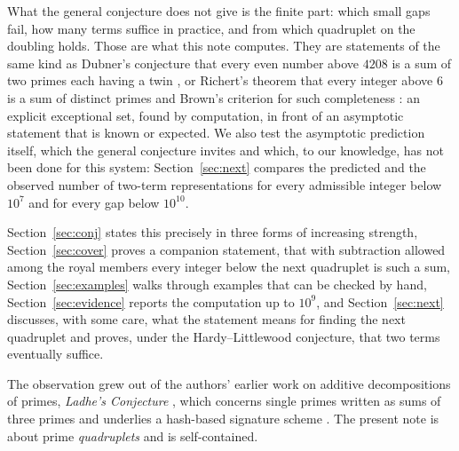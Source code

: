 \documentclass[11pt,a4paper]{article}
\begin{document}
What the general conjecture does not give is the finite part: which small
gaps fail, how many terms suffice in practice, and from which quadruplet on
the doubling holds. Those are what this note computes. They are statements
of the same kind as Dubner's conjecture that every even number above $4208$
is a sum of two primes each having a twin \cite{Dubner2000}, or Richert's
theorem that every integer above $6$ is a sum of distinct primes
\cite{Richert1949} and Brown's criterion for such completeness
\cite{Brown1961}: an explicit exceptional set, found by computation, in
front of an asymptotic statement that is known or expected. We also test the
asymptotic prediction itself, which the general conjecture invites and
which, to our knowledge, has not been done for this system: Section~\ref{sec:next}
compares the predicted and the observed number of two-term representations
for every admissible integer below $10^7$ and for every gap below $10^{10}$.

Section~\ref{sec:conj} states this
precisely in three forms of increasing strength, Section~\ref{sec:cover}
proves a companion statement, that with subtraction allowed among the
royal members every integer below the next quadruplet is such a sum,
Section~\ref{sec:examples} walks through examples that can be checked by
hand, Section~\ref{sec:evidence} reports the computation up to $10^9$, and
Section~\ref{sec:next} discusses, with some care, what the statement means
for finding the next quadruplet and proves, under the Hardy--Littlewood
conjecture, that two terms eventually suffice.

The observation grew out of the authors' earlier work on additive
decompositions of primes, \emph{Ladhe's Conjecture} \cite{LadheConj}, which
concerns single primes written as sums of three primes and underlies a
hash-based signature scheme \cite{LadheScheme}. The present note is about
prime \emph{quadruplets} and is self-contained.
\end{document}
